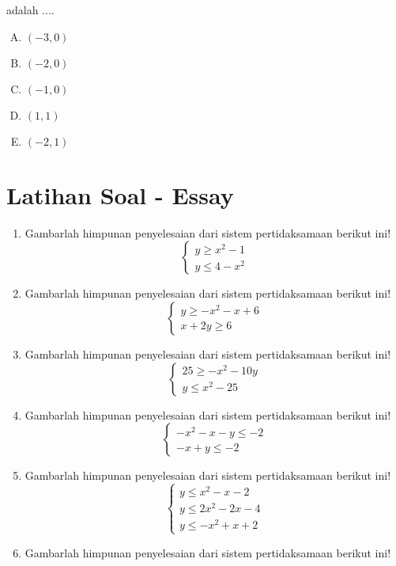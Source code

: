\documentclass[fleqn, a4paper, 12pt]{article} %
\begin{document}
\begin{enumerate}
			adalah ....
		\begin{enumerate}[(A)]
			\item $(-3, 0)$
			\item $(-2, 0)$
			\item $(-1, 0)$
			\item $(1, 1)$
			\item $(-2, 1)$
		\end{enumerate}
	\end{enumerate}
	
\section{Latihan Soal - Essay}

	\begin{enumerate}
		\item Gambarlah himpunan penyelesaian dari sistem pertidaksamaan berikut ini!
			\[\left\{\begin{array}{l}
				y \geq x^2 - 1 \\
				y \leq 4 - x^2
			\end{array}\right.\]
		\item Gambarlah himpunan penyelesaian dari sistem pertidaksamaan berikut ini!
			\[\left\{\begin{array}{l}
				y \geq -x^2 - x + 6	\\
				x + 2y \geq 6	
			\end{array}\right.\]
		\item Gambarlah himpunan penyelesaian dari sistem pertidaksamaan berikut ini!
			\[\left\{\begin{array}{l}
				25 \geq -x^2 - 10y \\
				y \leq x^2 - 25
			\end{array}\right.\]
		\item Gambarlah himpunan penyelesaian dari sistem pertidaksamaan berikut ini!
			\[\left\{\begin{array}{l}
				-x^2 - x - y \leq -2 \\
				-x + y \leq -2
			\end{array}\right.\]	
		\item Gambarlah himpunan penyelesaian dari sistem pertidaksamaan berikut ini!
			\[\left\{\begin{array}{l}
				y \leq x^2 - x - 2 \\
				y \leq 2x^2 - 2x - 4	\\
				y \leq -x^2 + x +2
			\end{array}\right.\]
		\item Gambarlah himpunan penyelesaian dari sistem pertidaksamaan berikut ini!

\end{enumerate}
\end{document}
